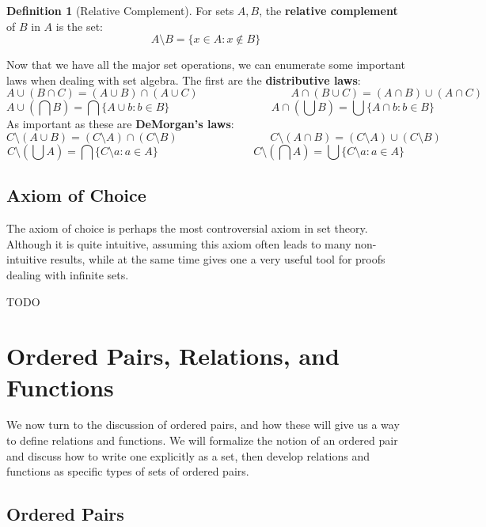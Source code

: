 \documentclass[11pt, oneside]{article}   	%
\theoremstyle{definition}
\newtheorem{definition}{Definition}[section]
\begin{document}
\begin{definition}[Relative Complement]
	For sets $A, B$, the \textbf{relative complement} of $B$ in $A$ is the set:
	\begin{equation}
		A\setminus B = \{x\in A : x\notin B\}
	\end{equation}
\end{definition}

Now that we have all the major set operations, we can enumerate some important laws when dealing with set algebra. The first 
are the \textbf{distributive laws}:
$$
	A\cup (B\cap C) = (A\cup B)\cap (A\cup C)\;\;\;\;\;\;\;\;\;\;\;\;\;\;\;\;\;\;\;\;\;\;\;\;\;\;\;\;\;\; A\cap (B\cup C) = (A\cap B)\cup (A\cap C)
$$
$$
	A\cup (\bigcap B) = \bigcap \{A\cup b : b\in B\}\;\;\;\;\;\;\;\;\;\;\;\;\;\;\;\;\;\;\;\;\;\;\;\;\;\;\;\;\;\;\;\;\; A\cap (\bigcup B) = \bigcup \{A\cap 
	b : b\in B\}
$$
As important as these are \textbf{DeMorgan's laws}:
$$
	C\setminus (A\cup B) = (C\setminus A)\cap (C\setminus B) \;\;\;\;\;\;\;\;\;\;\;\;\;\;\;\;\;\;\;\;\;\;\;\;\;\;\;\;\;\; C\setminus (A\cap B)
	= (C\setminus A)\cup (C\setminus B)
$$
$$
	C\setminus (\bigcup A) = \bigcap \{C\setminus a : a\in A\} \;\;\;\;\;\;\;\;\;\;\;\;\;\;\;\;\;\;\;\;\;\;\;\;\;\;\;\;\;\;\; C\setminus (\bigcap A) 
	= \bigcup\{C\setminus a : a\in A\}
$$

\subsection{Axiom of Choice}

The axiom of choice is perhaps the most controversial axiom in set theory. Although it is quite intuitive, assuming this axiom 
often leads to many non-intuitive results, while at the same time gives one a very useful tool for proofs dealing with infinite sets. 

TODO

\newpage
\section{Ordered Pairs, Relations, and Functions}

We now turn to the discussion of ordered pairs, and how these will give us a way to define relations and functions. We will 
formalize the notion of an ordered pair and discuss how to write one explicitly as a set, then develop relations and functions 
as specific types of sets of ordered pairs. 

\subsection{Ordered Pairs}
\end{document}

